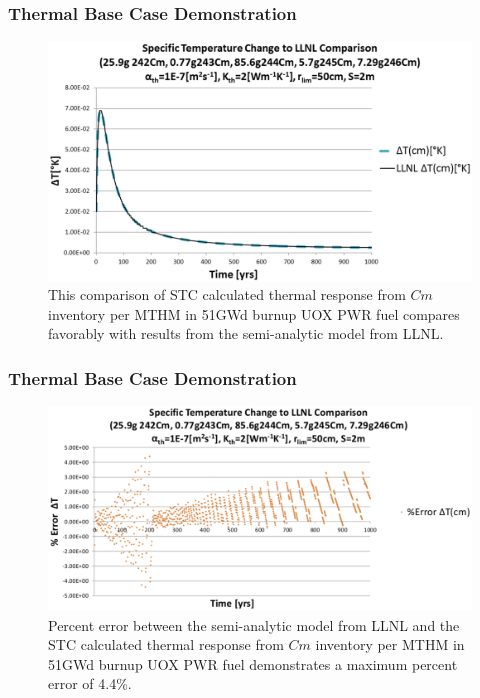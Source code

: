 
\begin{frame}[ctb!]
  \frametitle{Thermal Base Case Demonstration}
\begin{figure}[htp!]
\begin{center}
\includegraphics[width=\columnwidth]{./thermal_demonstration/CmValidation.eps}
\end{center}
\caption{This comparison of STC calculated thermal response from $Cm$ 
inventory per MTHM in 51GWd burnup UOX PWR fuel compares favorably with results 
from the semi-analytic model from LLNL.} 
\label{fig:CmValidation}
\end{figure}
\end{frame}


\begin{frame}[ctb!]
  \frametitle{Thermal Base Case Demonstration}
\begin{figure}[htp!]
\begin{center}
\includegraphics[width=\columnwidth]{./thermal_demonstration/CmPercentError.eps}
\end{center}
\caption{Percent error between the semi-analytic model from LLNL and the 
STC 
calculated thermal response from $Cm$ inventory per MTHM in 51GWd burnup UOX 
PWR fuel demonstrates a maximum percent error of 4.4\%.}
\label{fig:CmPercentError}
\end{figure}
\end{frame}

